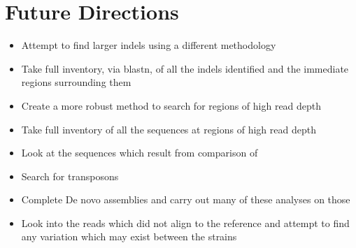 \documentclass[12pt]{article}
\begin{document}
\section{Future Directions}
\vspace{-0.5cm}
\begin{itemize}
\item Attempt to find larger indels using a different methodology
\vspace{-0.5cm}
\item Take full inventory, via blastn, of all the indels identified and the immediate regions surrounding them 
\vspace{-0.5cm}
\item Create a more robust method to search for regions of high read depth
\vspace{-0.5cm}
\item Take full inventory of all the sequences at regions of high read depth
\vspace{-0.5cm}
\item Look at the sequences which result from comparison of 
\vspace{-0.5cm}
\item Search for transposons
\vspace{-0.5cm}
\item Complete De novo assemblies and carry out many of these analyses on those
\vspace{-0.5cm}
\item Look into the reads which did not align to the reference and attempt to find any variation which may exist between the strains
\end{itemize}
\end{document}
